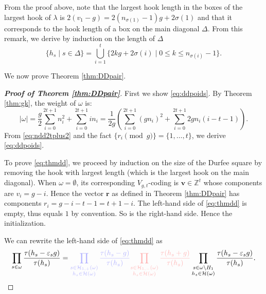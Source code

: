 \documentclass[11pt,letterpaper]{amsart}
\def\bbbz{\mathbb Z}
\def\cch{\mathcal H}
\numberwithin{equation}{section}
\numberwithin{df}{section}
\begin{document}
From the proof above, note that the largest hook length in the boxes of the largest hook of $\lambda$ is $2(v_1-g)=2(n_{\sigma(1)}-1)g+2\sigma(1)$ and that it corresponds to the hook length of a box on the main diagonal $\Delta$.
From this remark, we derive by induction on the length of $\Delta$
\begin{equation}\label{lem:Delta}
\lbrace h_s\mid s\in\Delta\rbrace=\bigcup_{i=1}^{t}\lbrace 2kg+2\sigma(i)\mid  0\leq k\leq n_{\sigma(i)}-1\rbrace.
\end{equation}

We now prove Theorem \ref{thm:DDpair}.

\begin{proof}[\textbf{Proof of Theorem \ref{thm:DDpair}}]
First we show \eqref{eq:ddpoids}. By Theorem \ref{thm:gk}, the weight of $\omega$ is:
\begin{equation*}
\lvert \omega\rvert=\frac{g}{2}\sum_{i=0}^{2t+1} n_i^2+\sum_{i=0}^{2t+1} in_i=\frac{1}{2g}\left(\sum_{i=0}^{2t+1} (gn_i)^2+\sum_{i=0}^{2t+1} 2gn_i(i-t-1)\right).
\end{equation*}
From \eqref{eq:ndd2tplus2} and the fact $\lbrace r_i\pmod{g}\rbrace=\lbrace 1,\dots,t\rbrace$, we derive \eqref{eq:ddpoids}.

To prove \eqref{eq:thmdd}, we proceed by induction on the size of the Durfee square by removing the hook with largest length (which is the largest hook on the main diagonal). When $\omega=\emptyset$, its corresponding $V_{g,t}$-coding is $\mathbf{v}\in\bbbz^t$ whose components are $v_i=g-i$. Hence the vector $\mathbf{r}$ as defined in Theorem \ref{thm:DDpair} has components $r_i=g-i-t-1=t+1-i$. The left-hand side of \eqref{eq:thmdd} is empty, thus equals $1$ by convention. So is the right-hand side. Hence the initialization.

We can rewrite the left-hand side of \eqref{eq:thmdd} as
\begin{multline}\label{eq:intermed}
\prod_{s\in\omega}\frac{\tau(h_s-\varepsilon_s g)}{\tau(h_s)}=\textcolor{blue!30}{\prod_{\substack{s\in\cch_{1,+}(\omega)\\h_s\in\cch(\omega)}}\frac{\tau(h_s-g)}{\tau(h_s)}}\textcolor{red!30}{\prod_{\substack{s\in\cch_{1,-}(\omega)\\h_s\in\cch(\omega)}}\frac{\tau(h_s+ g)}{\tau(h_s)}}
\prod_{\substack{s\in\omega\setminus H_1\\h_s\in\cch(\omega)}}\frac{\tau(h_s-\varepsilon_s g)}{\tau(h_s)}.
\end{multline}


\end{proof}
\end{document}
